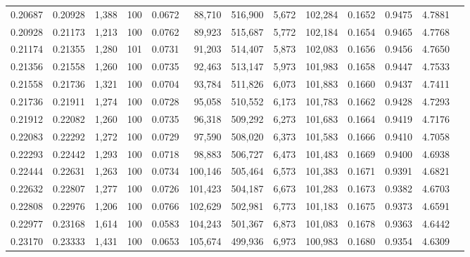 \begin{tabular}{rrrrrrrrrrrrr}
0.20687 & 0.20928 & 1,388 & 100 &                                     0.0672 &  88,710 & 516,900 &   5,672 & 102,284 & 0.1652 & 0.9475 & 4.7881 \\
0.20928 & 0.21173 & 1,213 & 100 &                                     0.0762 &  89,923 & 515,687 &   5,772 & 102,184 & 0.1654 & 0.9465 & 4.7768 \\
0.21174 & 0.21355 & 1,280 & 101 &                                     0.0731 &  91,203 & 514,407 &   5,873 & 102,083 & 0.1656 & 0.9456 & 4.7650 \\
0.21356 & 0.21558 & 1,260 & 100 &                                     0.0735 &  92,463 & 513,147 &   5,973 & 101,983 & 0.1658 & 0.9447 & 4.7533 \\
0.21558 & 0.21736 & 1,321 & 100 &                                     0.0704 &  93,784 & 511,826 &   6,073 & 101,883 & 0.1660 & 0.9437 & 4.7411 \\
0.21736 & 0.21911 & 1,274 & 100 &                                     0.0728 &  95,058 & 510,552 &   6,173 & 101,783 & 0.1662 & 0.9428 & 4.7293 \\
0.21912 & 0.22082 & 1,260 & 100 &                                     0.0735 &  96,318 & 509,292 &   6,273 & 101,683 & 0.1664 & 0.9419 & 4.7176 \\
0.22083 & 0.22292 & 1,272 & 100 &                                     0.0729 &  97,590 & 508,020 &   6,373 & 101,583 & 0.1666 & 0.9410 & 4.7058 \\
0.22293 & 0.22442 & 1,293 & 100 &                                     0.0718 &  98,883 & 506,727 &   6,473 & 101,483 & 0.1669 & 0.9400 & 4.6938 \\
0.22444 & 0.22631 & 1,263 & 100 &                                     0.0734 & 100,146 & 505,464 &   6,573 & 101,383 & 0.1671 & 0.9391 & 4.6821 \\
0.22632 & 0.22807 & 1,277 & 100 &                                     0.0726 & 101,423 & 504,187 &   6,673 & 101,283 & 0.1673 & 0.9382 & 4.6703 \\
0.22808 & 0.22976 & 1,206 & 100 &                                     0.0766 & 102,629 & 502,981 &   6,773 & 101,183 & 0.1675 & 0.9373 & 4.6591 \\
0.22977 & 0.23168 & 1,614 & 100 &                                     0.0583 & 104,243 & 501,367 &   6,873 & 101,083 & 0.1678 & 0.9363 & 4.6442 \\
0.23170 & 0.23333 & 1,431 & 100 &                                     0.0653 & 105,674 & 499,936 &   6,973 & 100,983 & 0.1680 & 0.9354 & 4.6309 \\

\end{tabular}
